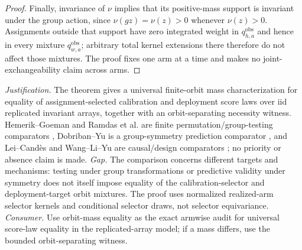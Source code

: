 \documentclass{article}
\begin{document}
\begin{proof}
Finally, invariance of \(\nu\) implies that its positive-mass support is invariant under the group action, since \(\nu(gz)=\nu(z)>0\) whenever \(\nu(z)>0\). Assignments outside that support have zero integrated weight in \(q^{\mathrm{obs}}_{h,a}\) and hence in every mixture \(q^{\mathrm{obs}}_{w,a}\); arbitrary total kernel extensions there therefore do not affect those mixtures. The proof fixes one arm at a time and makes no joint-exchangeability claim across arms.
\end{proof}
\par\smallskip\noindent \textit{Justification.} The theorem gives a universal finite-orbit mass characterization for equality of assignment-selected calibration and deployment score laws over iid replicated invariant arrays, together with an orbit-separating necessity witness. Hemerik--Goeman and Ramdas et al. are finite permutation/group-testing comparators \cite{HemerikGoeman2018,RamdasBarberCandesTibshirani2023}, Dobriban--Yu is a group-symmetry prediction comparator \cite{DobribanYu2025}, and Lei--Candès and Wang--Li--Yu are causal/design comparators \cite{LeiCandes2021,WangLiYu2025}; no priority or absence claim is made. \textit{Gap.} The comparison concerns different targets and mechanisms: testing under group transformations or predictive validity under symmetry does not itself impose equality of the calibration-selector and deployment-target orbit mixtures. The proof uses normalized realized-arm selector kernels and conditional selector draws, not selector equivariance. \textit{Consumer.} Use orbit-mass equality as the exact armwise audit for universal score-law equality in the replicated-array model; if a mass differs, use the bounded orbit-separating witness.
\end{document}
